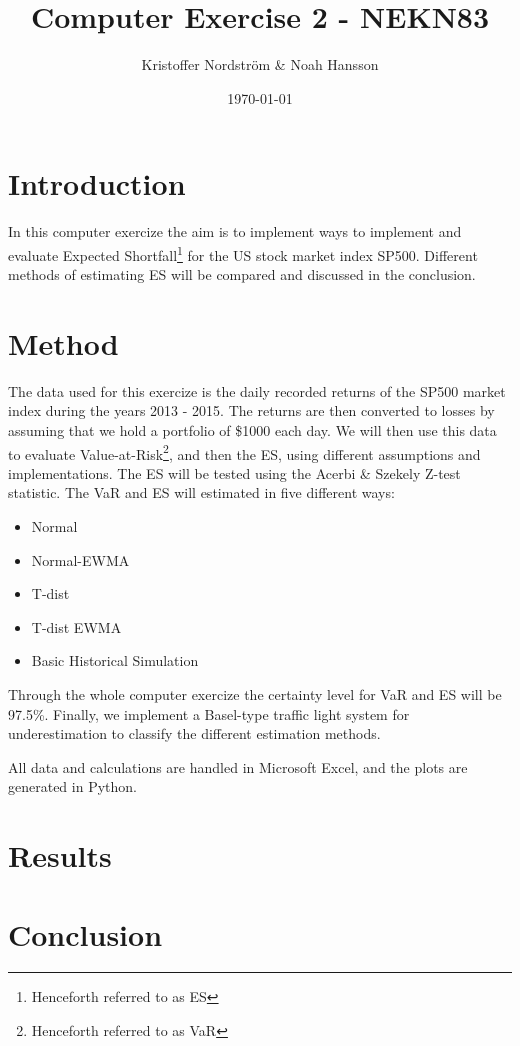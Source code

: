 \documentclass[a4paper]{article}
\title{Computer Exercise 2 - NEKN83}
\author{Kristoffer Nordström \& Noah Hansson}
\date{\today}
\begin{document}
\maketitle


\section{Introduction}
In this computer exercize the aim is to implement ways to implement and evaluate Expected Shortfall\footnote{Henceforth referred to as ES} for the US stock market index SP500. Different methods of estimating ES will be compared and discussed in the conclusion.

\section{Method}
The data used for this exercize is the daily recorded returns of the SP500 market index during the years 2013 - 2015. The returns are then converted to losses by assuming that we hold a portfolio of \$1000 each day. We will then use this data to evaluate Value-at-Risk\footnote{Henceforth referred to as VaR}, and then the ES, using different assumptions and implementations. The ES will be tested using the Acerbi \& Szekely Z-test statistic. The VaR and ES will estimated in five different ways:
\begin{itemize}
    \item Normal
    \item Normal-EWMA
    \item T-dist
    \item T-dist EWMA
    \item Basic Historical Simulation
\end{itemize}
Through the whole computer exercize the certainty level for VaR and ES will be 97.5\%. Finally, we implement a Basel-type traffic light system for underestimation to classify the different estimation methods.

All data and calculations are handled in Microsoft Excel, and the plots are generated in Python.

\section{Results}

\section{Conclusion}
\end{document}
